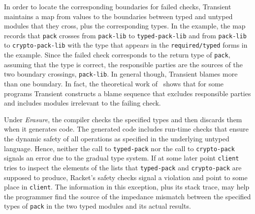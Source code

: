 In order to locate the corresponding boundaries for failed checks, Transient
maintains a map from values to the boundaries between typed and untyped modules that
they cross, plus the corresponding types. In the example, the map records that
\texttt{pack} crosses from \texttt{pack-lib} to {\tt typed-pack-lib} and
from {\tt pack-lib} to {\tt crypto-pack-lib} with the type that appears in the
{\tt required/typed} forms in the example. Since the failed check corresponds to
the return type of \texttt{pack}, assuming that the type is correct, 
the responsible parties are the sources of the two
boundary crossings, \texttt{pack-lib}. In
general though, Transient blames more than one boundary. In fact, the theoretical
work of~\citet{gfd-oopsla-2019} shows that for some programs Transient
constructs a blame sequence that excludes responsible parties and includes modules
irrelevant to the failing check.

Under {\it Erasure\/}, the compiler checks the specified types and
then discards them when it generates code. The generated code includes run-time
checks that ensure the dynamic safety of all operations as specified in the
underlying untyped language. Hence, neither the call to {\tt typed-pack} nor the
call to {\tt crypto-pack} signals an error due to the gradual type system. If
at some later point {\tt client} tries to inspect the elements of the lists
that \texttt{typed-pack} and {\tt crypto-pack} are supposed to produce, Racket's
safety checks signal a violation and point to some place in {\tt client}. The
information in this exception, plus its stack trace, may help the programmer
find the source of the impedance mismatch between the specified types of
{\tt pack} in the two typed modules and its actual results.

